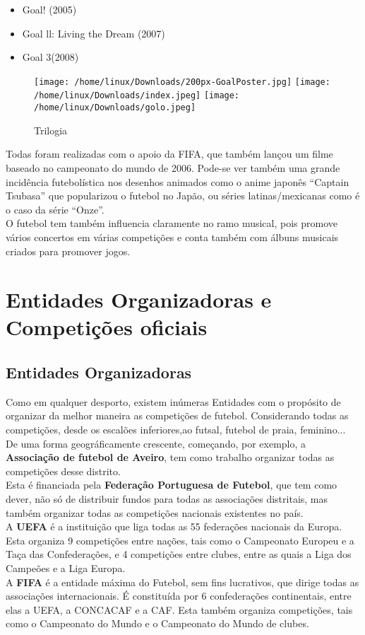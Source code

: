 \documentclass[a4paper,12pt]{report}
\begin{document}
\begin{itemize}
\item Goal! (2005) 
\item Goal ll: Living the Dream (2007) 
\item Goal 3(2008)
\end{itemize} 

\begin{figure}[!htp]
\texttt{[image: /home/linux/Downloads/200px-GoalPoster.jpg]}
\texttt{[image: /home/linux/Downloads/index.jpeg]}
\texttt{[image: /home/linux/Downloads/golo.jpeg]}
\caption{Trilogia}
\end{figure} 


 Todas foram realizadas com o apoio da FIFA, que também lançou um filme baseado no campeonato do mundo de 2006. Pode-se ver também uma grande incidência futebolística nos desenhos animados como o anime japonês “Captain Tsubasa” que popularizou o futebol no Japão, ou séries latinas/mexicanas como é o caso da série “Onze”. \\
O futebol tem também influencia claramente no ramo musical, pois promove vários concertos em várias competições e conta também com álbuns musicais criados para promover jogos.

\chapter{Entidades Organizadoras e Competições oficiais}
\label{chap.Entidades Organizadoras e Competições oficiais}

\section{Entidades Organizadoras}
\label{Entidades Organizadoras}
Como em qualquer desporto, existem inúmeras Entidades com o propósito de organizar da melhor maneira as competições de futebol. Considerando todas as competições, desde os escalões inferiores,ao futsal, futebol de praia, feminino... \\
De uma forma geográficamente crescente, começando, por exemplo, a {\bf Associação de futebol de Aveiro}, tem como trabalho organizar todas as competições desse distrito. \\ Esta é financiada pela {\bf Federação Portuguesa de Futebol}, que tem como dever, não só de distribuir fundos para todas as associações distritais, mas também organizar todas as competições nacionais existentes no país.\\
A {\bf \ac{UEFA}} é a instituição que liga todas as 55 federações nacionais da Europa. Esta organiza 9 competições entre nações, tais como o Campeonato Europeu e a Taça das Confederações, e 4 competições entre clubes, entre as quais a Liga dos Campeões e a Liga Europa. \\
A {\bf FIFA} é a entidade máxima do Futebol, sem fins lucrativos, que dirige todas as associações internacionais. É constituída por 6 confederações continentais, entre elas a UEFA, a CONCACAF e a CAF. Esta também organiza competições, tais como o Campeonato do Mundo e o Campeonato do Mundo de clubes. \newpage
\end{document}
